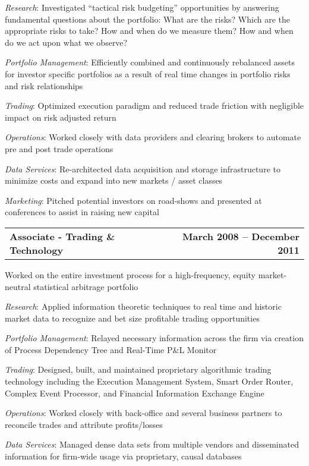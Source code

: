 \documentclass[letterpaper]{article}
\begin{document}
    \begin{list}{}{\leftmargin=1em}
      \item \textit{Research}: Investigated ``tactical risk budgeting'' opportunities
        by answering fundamental questions about the portfolio: What are the risks?
        Which are the appropriate risks to take? How and when do we measure them?
        How and when do we act upon what we observe?
      \item \textit{Portfolio Management}: Efficiently combined and continuously
        rebalanced assets for investor specific portfolios as a result of real
        time changes in portfolio risks and risk relationships
      \item \textit{Trading}: Optimized execution paradigm and reduced trade
        friction with negligible impact on risk adjusted return
      \item \textit{Operations}: Worked closely with data providers and clearing
        brokers to automate pre and post trade operations
      \item \textit{Data Services}: Re-architected data acquisition and storage
        infrastructure to minimize costs and expand into new markets / asset classes
      \item \textit{Marketing}: Pitched potential investors on road-shows and
        presented at conferences to assist in raising new capital
    \end{list}
  \begin{tabular*}{7.5in}{@{\extracolsep{\fill}}lr}
    \textbf{Associate - Trading \& Technology} & \textbf{March 2008 -- December 2011}
  \end{tabular*}
    \begin{list}{}{\leftmargin=0em}
      \item Worked on the entire investment process for a high-frequency,
        equity market-neutral statistical arbitrage portfolio
    \end{list}
    \begin{list}{}{\leftmargin=1em}
      \item \textit{Research}: Applied information theoretic techniques to real
        time and historic market data to recognize and bet size profitable trading
        opportunities
      \item \textit{Portfolio Management}: Relayed necessary information across
        the firm via creation of Process Dependency Tree and Real-Time P\&L Monitor
      \item \textit{Trading}: Designed, built, and maintained proprietary algorithmic
        trading technology including the Execution Management System, Smart Order
        Router, Complex Event Processor, and Financial Information Exchange Engine
      \item \textit{Operations}: Worked closely with back-office and several
        business partners to reconcile trades and attribute profits/losses
      \item \textit{Data Services}: Managed dense data sets from multiple vendors
        and disseminated information for firm-wide usage via proprietary, causal databases
    \end{list}
\end{document}
